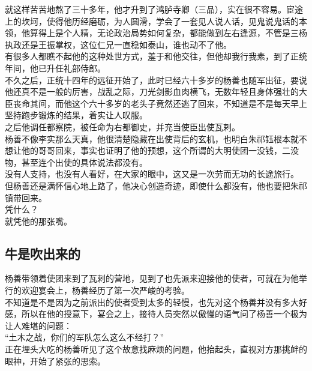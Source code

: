 \begin{multicols}{\theparacolNo}
就这样苦苦地熬了三十多年，他才升到了鸿胪寺卿（三品），实在很不容易。宦途上的坎坷，使得他历经磨砺，为人圆滑，学会了一套见人说人话，见鬼说鬼话的本领，他算得上是个人精，无论政治局势如何复杂，都能做到左右逢源，不管是三杨执政还是王振掌权，这位仁兄一直稳如泰山，谁也动不了他。\\

有很多人都瞧不起他的这种处世方式，羞于和他交往，但他却我行我素，到了正统年间，他已升任礼部侍郎。\\

不久之后，正统十四年的远征开始了，此时已经六十多岁的杨善也随军出征，要说他还真不是一般的厉害，战乱之际，刀光剑影血肉横飞，无数年轻且身体强壮的大臣丧命其间，而他这个六十多岁的老头子竟然还逃了回来，不知道是不是每天早上坚持跑步锻炼的结果，着实让人叹服。\\

之后他调任都察院，被任命为右都御史，并充当使臣出使瓦剌。\\

杨善不像李实那么天真，他很清楚隐藏在出使背后的玄机，也明白朱祁钰根本就不想让他的哥哥回来，事实也证明了他的预想，这个所谓的大明使团一没钱，二没物，甚至连个出使的具体说法都没有。\\

没有人支持，也没有人看好，在大家的眼中，这又是一次劳而无功的长途旅行。\\

但杨善还是满怀信心地上路了，他决心创造奇迹，即使什么都没有，他也要把朱祁镇带回来。\\

凭什么？\\

就凭他的那张嘴。\\

\subsection{牛是吹出来的}
杨善带领着使团来到了瓦剌的营地，见到了也先派来迎接他的使者，可就在为他举行的欢迎宴会上，杨善经历了第一次严峻的考验。\\

不知道是不是因为之前派出的使者受到太多的轻慢，也先对这个杨善并没有多大好感，所以在他的授意下，宴会之上，接待人员突然以傲慢的语气问了杨善一个极为让人难堪的问题：\\

“土木之战，你们的军队怎么这么不经打？”\\

正在埋头大吃的杨善听见了这个故意找麻烦的问题，他抬起头，直视对方那挑衅的眼神，开始了紧张的思索。\\


\end{multicols}
